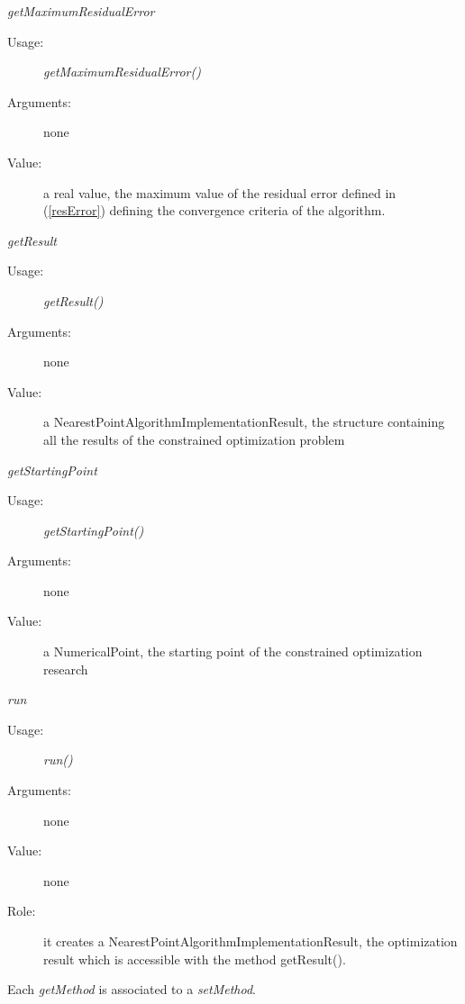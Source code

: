\begin{description}
\begin{description}
  \item \textit{getMaximumResidualError}
    \begin{description}
    \item[Usage:] \textit{getMaximumResidualError()}
    \item[Arguments:] none
    \item[Value:] a real value, the maximum value of the residual  error defined in (\ref{resError}) defining the convergence criteria of the algorithm. 
    \end{description}
    \bigskip

  \item \textit{getResult}
    \begin{description}
    \item[Usage:] \textit{getResult()}
    \item[Arguments:] none
    \item[Value:] a NearestPointAlgorithmImplementationResult, the structure containing all the results of the constrained optimization problem
    \end{description}
    \bigskip

  \item \textit{getStartingPoint}
    \begin{description}
    \item[Usage:] \textit{getStartingPoint()}
    \item[Arguments:] none
    \item[Value:] a NumericalPoint, the starting point of the constrained optimization research
    \end{description}
    \bigskip

  \item \textit{run}
    \begin{description}
    \item[Usage:] \textit{run()}
    \item[Arguments:] none
    \item[Value:] none
    \item[Role:] it creates a NearestPointAlgorithmImplementationResult, the optimization result which is accessible with the method getResult().
    \end{description}
  \end{description}

  Each  \textit{getMethod}  is associated to a \textit{setMethod}.


\end{description}

